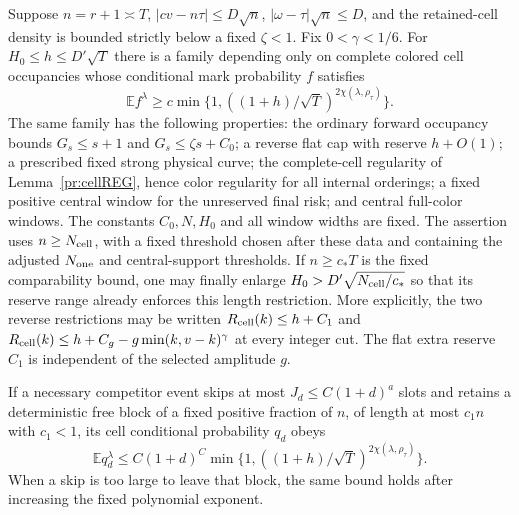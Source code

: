 \begin{theorem}\label{pr:cell-critical}
Suppose $n=r+1\asymp T$, $|cv-n\tau|\le D\sqrt n$,
$|\omega-\tau|\sqrt n\le D$, and the retained-cell density is bounded
strictly below a fixed $\zeta<1$. Fix $0<\gamma<1/6$.
For $H_0\le h\le D'\sqrt T$ there is a family depending only on complete
colored cell occupancies whose conditional mark probability $f$ satisfies
\begin{equation}
 \mathbb E f^\lambda\ge c
       \min\{1,((1+h)/\sqrt T)^{2\chi(\lambda,\rho_\tau)}\}.
 \label{pr:cell-lower}
\end{equation}
The same family has the following properties: the ordinary forward
occupancy bounds $G_s\le s+1$ and $G_s\le\zeta s+C_0$; a reverse flat
cap with reserve $h+O(1)$; a prescribed fixed strong physical curve;
the complete-cell regularity of Lemma~\ref{pr:cellREG}, hence color
regularity for all internal orderings; a fixed positive central window
for the unreserved final risk; and central full-color windows.
The constants $C_0,N,H_0$ and all window widths are fixed. The assertion
uses $n\ge N_{\rm cell}$, with a fixed threshold chosen after these
data and containing the adjusted $N_{\rm one}$ and central-support
thresholds. If $n\ge c_*T$ is the fixed comparability bound, one may
finally enlarge $H_0>D'\sqrt{N_{\rm cell}/c_*}$ so that its reserve
range already enforces this length restriction.
More explicitly, the two reverse restrictions may be written
$R_{\rm cell}(k)\le h+C_1$ and
$R_{\rm cell}(k)\le h+C_g-g\min(k,v-k)^\gamma$ at every integer cut.
The flat extra reserve $C_1$ is independent of the selected amplitude $g$.

If a necessary competitor event skips at most $J_d\le C(1+d)^a$ slots
and retains a deterministic free block of a fixed positive fraction of
$n$, of length at most $c_1n$ with $c_1<1$, its cell conditional probability
$q_d$ obeys
\begin{equation}
 \mathbb E q_d^\lambda\le C(1+d)^C
       \min\{1,((1+h)/\sqrt T)^{2\chi(\lambda,\rho_\tau)}\}.
 \label{pr:cell-competitor}
\end{equation}
When a skip is too large to leave that block, the same bound holds after
increasing the fixed polynomial exponent.
\end{theorem}
